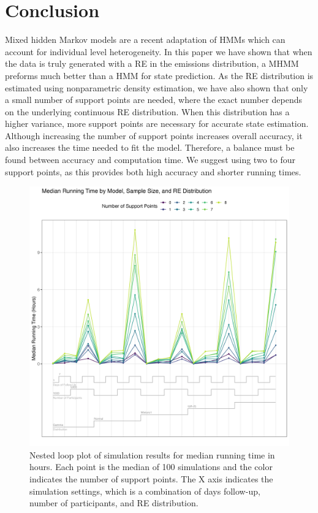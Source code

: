 \documentclass{article}
\begin{document}
\section{Conclusion}

Mixed hidden Markov models are a recent adaptation of HMMs 
which can account for individual level heterogeneity. In this 
paper we have shown that when the data is truly generated with 
a RE in the emissions distribution, a MHMM preforms much better 
than a HMM for state prediction. As the RE distribution is 
estimated using nonparametric density estimation, we have also 
shown that only a small number of support points are needed, 
where the exact number depends on the underlying continuous 
RE distribution. When this distribution has a higher variance, 
more support points are necessary for accurate state estimation. 
Although increasing the number of support points increases 
overall accuracy, it also increases the time needed to fit the model. 
Therefore, a balance must be found between accuracy and 
computation time. We suggest using two to four support points, 
as this provides both high accuracy and shorter running times. 


\begin{figure}
\includegraphics[scale=.55]{Support/NestedLoopCompTime.png}
\centering
\caption{Nested loop plot of simulation results for median 
running time in hours. Each point is the median of 100 simulations 
and the color indicates the number of support points. 
The X axis indicates the simulation settings, which is a 
combination of days follow-up, number of participants, and RE distribution.}
\label{time}
\end{figure}




\end{document}
